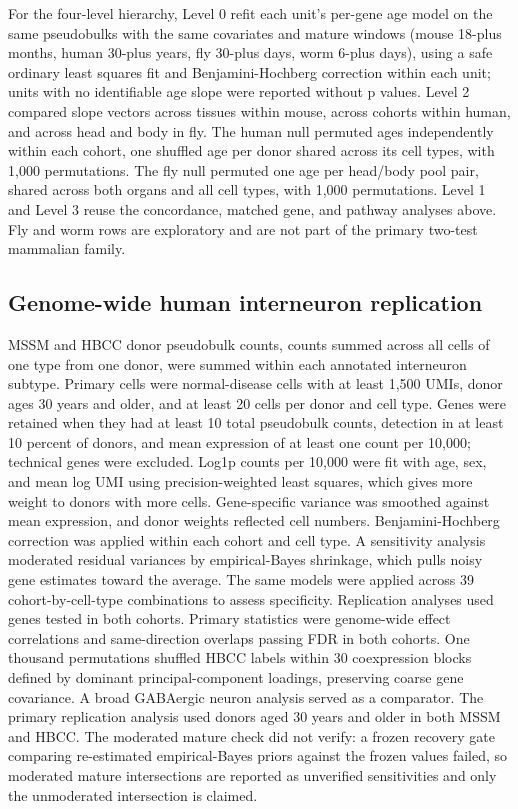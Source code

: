 \documentclass[11pt]{article}
\begin{document}
For the four-level hierarchy, Level 0 refit each unit's per-gene age model on the same pseudobulks with the same covariates and mature windows (mouse 18-plus months, human 30-plus years, fly 30-plus days, worm 6-plus days), using a safe ordinary least squares fit and Benjamini-Hochberg correction within each unit; units with no identifiable age slope were reported without p values. Level 2 compared slope vectors across tissues within mouse, across cohorts within human, and across head and body in fly. The human null permuted ages independently within each cohort, one shuffled age per donor shared across its cell types, with 1,000 permutations. The fly null permuted one age per head/body pool pair, shared across both organs and all cell types, with 1,000 permutations. Level 1 and Level 3 reuse the concordance, matched gene, and pathway analyses above. Fly and worm rows are exploratory and are not part of the primary two-test mammalian family.

\subsection*{Genome-wide human interneuron replication}

MSSM and HBCC donor pseudobulk counts, counts summed across all cells of one type from one donor, were summed within each annotated interneuron subtype. Primary cells were normal-disease cells with at least 1,500 UMIs, donor ages 30 years and older, and at least 20 cells per donor and cell type. Genes were retained when they had at least 10 total pseudobulk counts, detection in at least 10 percent of donors, and mean expression of at least one count per 10,000; technical genes were excluded. Log1p counts per 10,000 were fit with age, sex, and mean log UMI using precision-weighted least squares, which gives more weight to donors with more cells. Gene-specific variance was smoothed against mean expression, and donor weights reflected cell numbers. Benjamini-Hochberg correction was applied within each cohort and cell type. A sensitivity analysis moderated residual variances by empirical-Bayes shrinkage, which pulls noisy gene estimates toward the average. The same models were applied across 39 cohort-by-cell-type combinations to assess specificity. Replication analyses used genes tested in both cohorts. Primary statistics were genome-wide effect correlations and same-direction overlaps passing FDR in both cohorts. One thousand permutations shuffled HBCC labels within 30 coexpression blocks defined by dominant principal-component loadings, preserving coarse gene covariance. A broad GABAergic neuron analysis served as a comparator. The primary replication analysis used donors aged 30 years and older in both MSSM and HBCC. The moderated mature check did not verify: a frozen recovery gate comparing re-estimated empirical-Bayes priors against the frozen values failed, so moderated mature intersections are reported as unverified sensitivities and only the unmoderated intersection is claimed.
\end{document}
